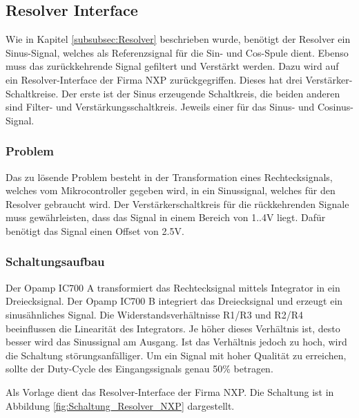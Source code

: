 \subsection{Resolver Interface}\label{subsec:SinCos_Interface}
Wie in Kapitel \ref{subsubsec:Resolver} beschrieben wurde, benötigt der Resolver ein Sinus-Signal, welches als Referenzsignal für die Sin- und Cos-Spule dient. Ebenso muss das zurückkehrende Signal gefiltert und Verstärkt werden.
Dazu wird auf ein Resolver-Interface der Firma NXP zurückgegriffen. Dieses hat drei Verstärker-Schaltkreise. Der erste ist der Sinus erzeugende Schaltkreis, die beiden anderen sind Filter- und Verstärkungsschaltkreis. Jeweils einer für das Sinus- und Cosinus-Signal.

\subsubsection{Problem}\label{subsubsec:Problem_TMC6200}

Das zu lösende Problem besteht in der Transformation eines Rechtecksignals, welches vom Mikrocontroller gegeben wird, in ein Sinussignal, welches für den Resolver gebraucht wird. Der Verstärkerschaltkreis für die rückkehrenden Signale muss gewährleisten, dass das Signal in einem Bereich von 1..4V liegt. Dafür benötigt das Signal einen Offset von 2.5V.

\subsubsection{Schaltungsaufbau}\label{subsubsec:Schaltungsaufbau_TMC6200}

Der Opamp IC700 A transformiert das Rechtecksignal mittels Integrator in ein Dreiecksignal. Der Opamp IC700 B integriert das Dreiecksignal und erzeugt ein sinusähnliches Signal.
Die Widerstandsverhältnisse R1/R3 und R2/R4 beeinflussen die Linearität des Integrators. Je höher dieses Verhältnis ist, desto besser wird das Sinussignal am Ausgang. Ist das Verhältnis jedoch zu hoch, wird die Schaltung störungsanfälliger. Um ein Signal mit hoher Qualität zu erreichen, sollte der Duty-Cycle des Eingangssignals genau 50\% betragen.\cite{mienkina_56f80x_nodate}

Als Vorlage dient das Resolver-Interface der Firma NXP. Die Schaltung ist in Abbildung \ref{fig:Schaltung_Resolver_NXP} dargestellt.

